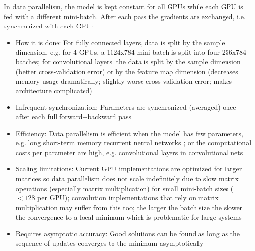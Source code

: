 \documentclass{article} %
\begin{document}
In data parallelism, the model is kept constant for all GPUs while each GPU is fed with a different mini-batch. After each pass the gradients are exchanged, i.e. synchronized with each GPU:
\begin{itemize} 	
	\item How it is done: For fully connected layers, data is split by the sample dimension, e.g. for 4 GPUs, a 1024x784 mini-batch is split into four 256x784 batches; for convolutional layers, the data is split by the sample dimension (better cross-validation error) or by the feature map dimension (decreases memory usage dramatically; slightly worse cross-validation error; makes architecture complicated)
	\item Infrequent synchronization: Parameters are synchronized (averaged) once after each full forward+backward pass
	\item Efficiency: Data parallelism is efficient when the model has few parameters, e.g. long short-term memory recurrent neural networks \citep{hochreiter1997long}; or the computational costs per parameter are high, e.g. convolutional layers in convolutional nets
	\item Scaling limitations: Current GPU implementations are optimized for larger matrices so data parallelism does not scale indefinitely due to slow matrix operations (especially matrix multiplication) for small mini-batch sizes ($< 128$ per GPU); convolution implementations that rely on matrix multiplication may suffer from this too; the larger the batch size the slower the convergence to a local minimum which is problematic for large systems
	\item Requires asymptotic accuracy: Good solutions can be found as long as the sequence of updates converges to the minimum asymptotically \citep{seide20141}
\end{itemize}
\end{document}
